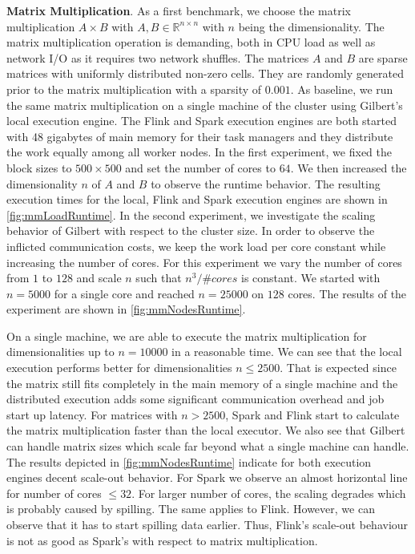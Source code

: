 \textbf{Matrix Multiplication}. 
As a first benchmark, we choose the matrix multiplication $A\times B$ with $A,B \in \mathbb{R}^{n\times n}$ with $n$ being the dimensionality. 
The matrix multiplication operation is demanding, both in CPU load as well as network I/O as it requires two network shuffles. 
The matrices $A$ and $B$ are sparse matrices with uniformly distributed non-zero cells. 
They are randomly generated prior to the matrix multiplication with a sparsity of $0.001$. 
As baseline, we run the same matrix multiplication on a single machine of the cluster using Gilbert's local execution engine. 
The Flink and Spark execution engines are both started with 48 gigabytes of main memory for their task managers and they distribute the work equally among all worker nodes. 
In the first experiment, we fixed the block sizes to $500 \times 500$ and set the number of cores to $64$. 
We then increased the dimensionality $n$ of $A$ and $B$ to observe the runtime behavior. 
The resulting execution times for the local, Flink and Spark execution engines are shown in \cref{fig:mmLoadRuntime}. 
In the second experiment, we investigate the scaling behavior of Gilbert with respect to the cluster size. 
In order to observe the inflicted communication costs, we keep the work load per core constant while increasing the number of cores. 
For this experiment we vary the number of cores from $1$ to $128$ and scale $n$ such that $n^3/\#cores$ is constant. 
We started with $n=5000$ for a single core and reached $n=25000$ on $128$ cores. 
The results of the experiment are shown in \cref{fig:mmNodesRuntime}. 

On a single machine, we are able to execute the matrix multiplication for dimensionalities up to $n=10000$ in a reasonable time. 
We can see that the local execution performs better for dimensionalities $n \le 2500$. 
That is expected since the matrix still fits completely in the main memory of a single machine and the distributed execution adds some significant communication overhead and job start up latency. 
For matrices with $n>2500$, Spark and Flink start to calculate the matrix multiplication faster than the local executor. 
We also see that Gilbert can handle matrix sizes which scale far beyond what a single machine can handle. 
The results depicted in \cref{fig:mmNodesRuntime} indicate for both execution engines decent scale-out behavior.
For Spark we observe an almost horizontal line for number of cores $\le 32$.
For larger number of cores, the scaling degrades which is probably caused by spilling.
The same applies to Flink.
However, we can observe that it has to start spilling data earlier.
Thus, Flink's scale-out behaviour is not as good as Spark's with respect to matrix multiplication.

